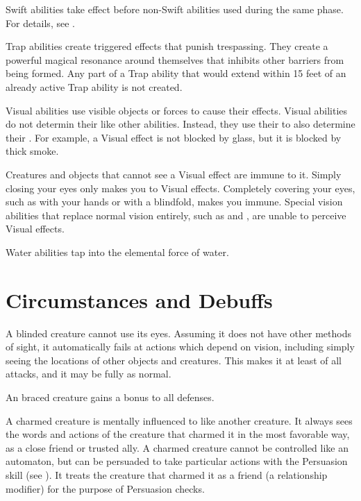    Swift abilities take effect before non-Swift abilities used during the same phase.
  For details, see .

   Trap abilities create triggered effects that punish trespassing.
  They create a powerful magical resonance around themselves that inhibits other barriers from being formed.
  Any part of a Trap ability that would extend within 15 feet of an already active Trap ability is not created.

   Visual abilities use visible objects or forces to cause their effects.
  Visual abilities do not determin their  like other abilities.
  Instead, they use their  to also determine their .
  For example, a Visual effect is not blocked by glass, but it is blocked by thick smoke.

  Creatures and objects that cannot see a Visual effect are immune to it.
  Simply closing your eyes only makes you \impervious to Visual effects.
  Completely covering your eyes, such as with your hands or with a blindfold, makes you immune.
  Special vision abilities that replace normal vision entirely, such as  and , are unable to perceive Visual effects.

   Water abilities tap into the elemental force of water.

  \newpage
\section{Circumstances and Debuffs}\label{Circumstances and Debuffs}

   A blinded creature cannot use its eyes.
  Assuming it does not have other methods of sight, it automatically fails at actions which depend on vision, including simply seeing the locations of other objects and creatures.
  This makes it at least \partiallyunaware of all attacks, and it may be fully \unaware as normal.

   An braced creature gains a  bonus to all defenses.

   A charmed creature is mentally influenced to like another creature.
  It always sees the words and actions of the creature that charmed it in the most favorable way, as a close friend or trusted ally.
  A charmed creature cannot be controlled like an automaton, but can be persuaded to take particular actions with the Persuasion skill (see ).
  It treats the creature that charmed it as a friend (a  relationship modifier) for the purpose of Persuasion checks.

